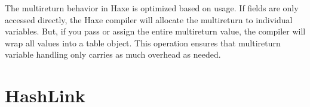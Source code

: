 The multireturn behavior in Haxe is optimized based on usage.  If fields are
only accessed directly, the Haxe compiler will allocate the multireturn to
individual variables.  But, if you pass or assign the entire multireturn value,
the compiler will wrap all values into a table object.  This operation ensures
that multireturn variable handling only carries as much overhead as needed.



\section{HashLink}
\label{target-hl}
